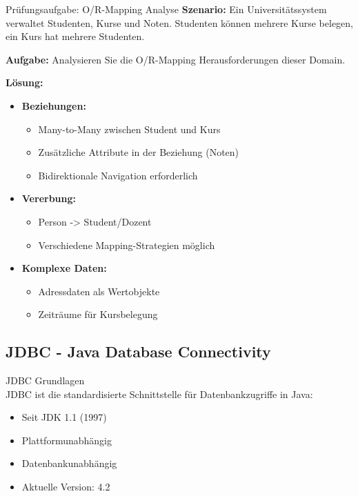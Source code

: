 \begin{example2}{Prüfungsaufgabe: O/R-Mapping Analyse}
\textbf{Szenario:}
Ein Universitätssystem verwaltet Studenten, Kurse und Noten. Studenten können mehrere 
Kurse belegen, ein Kurs hat mehrere Studenten.

\textbf{Aufgabe:} 
Analysieren Sie die O/R-Mapping Herausforderungen dieser Domain.

\textbf{Lösung:}
\begin{itemize}
    \item \textbf{Beziehungen:}
    \begin{itemize}
        \item Many-to-Many zwischen Student und Kurs
        \item Zusätzliche Attribute in der Beziehung (Noten)
        \item Bidirektionale Navigation erforderlich
    \end{itemize}
    
    \item \textbf{Vererbung:}
    \begin{itemize}
        \item Person -> Student/Dozent
        \item Verschiedene Mapping-Strategien möglich
    \end{itemize}
    
    \item \textbf{Komplexe Daten:}
    \begin{itemize}
        \item Adressdaten als Wertobjekte
        \item Zeiträume für Kursbelegung
    \end{itemize}
\end{itemize}
\end{example2}

\subsection{JDBC - Java Database Connectivity}

\begin{concept}{JDBC Grundlagen}\\
JDBC ist die standardisierte Schnittstelle für Datenbankzugriffe in Java:
\begin{itemize}
    \item Seit JDK 1.1 (1997)
    \item Plattformunabhängig
    \item Datenbankunabhängig
    \item Aktuelle Version: 4.2
\end{itemize}
\end{concept}

